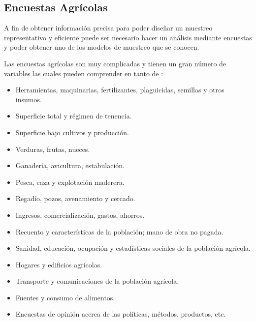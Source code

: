 %
%

\subsection{Encuestas Agrícolas}

A fin de obtener información precisa para poder diseñar un muestreo representativo y eficiente puede ser necesario hacer un análisis mediante encuestas y poder obtener uno de los modelos de muestreo que se conocen.

\bigbreak

Las encuestas agrícolas son muy complicadas y tienen un gran número de variables las cuales pueden comprender en tanto de \cite{organizacion-de-las-naciones-unidas-para-la-agricultura-y-la-alimentacion-1990}:

\begin{itemize}
    \item Herramientas, maquinarias, fertilizantes, plaguicidas, semillas y otros insumos.
    \item Superficie total y régimen de tenencia.
    \item Superficie bajo cultivos y producción.
    \item Verduras, frutas, nueces.
    \item Ganadería, avicultura, estabulación.

    \item Pesca, caza y explotación maderera.
    \item Regadío, pozos, avenamiento y cercado.
    \item Ingresos, comercialización, gastos, ahorros.
    \item Recuento y características de la población; mano de obra no pagada.
    \item Sanidad, educación, ocupación y estadísticas sociales de la población agrícola.
    \item Hogares y edificios agrícolas.
    \item Transporte y comunicaciones de la población agrícola.
    \item Fuentes y consumo de alimentos.
    \item Encuestas de opinión acerca de las políticas, métodos, productos, etc.
\end{itemize}

